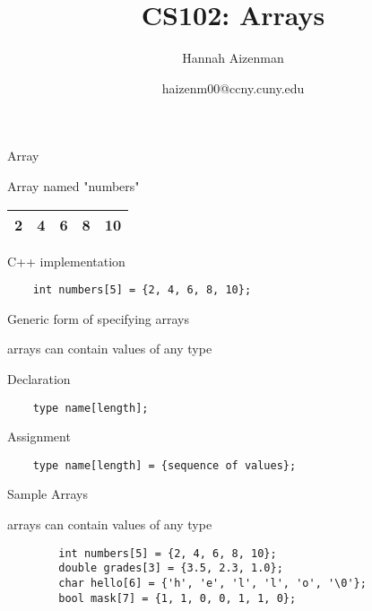 \documentclass[xcolor={dvipsnames}]{beamer}
\begin{document}
\title{ CS102: Arrays}
\author{Hannah Aizenman}
\date{haizenm00@ccny.cuny.edu}


\begin{frame}
	\titlepage
\end{frame}


\begin{frame}[fragile]{Array}
	\begin{block}{Array named "numbers"}
	\begin{table}
	\Huge
	\begin{tabular}{|c|c|c|c|c|}
	\hline
	2  & 4 & 6 & 8 & 10\\
	\hline
	\end{tabular}
	\end{table}
	\end{block}
	\pause
	\begin{block}{C++ implementation}
	\begin{verbatim}
	int numbers[5] = {2, 4, 6, 8, 10};
	\end{verbatim}
	\end{block}
\end{frame}

\begin{frame}[fragile]{Generic form of specifying arrays}
\begin{center}
	arrays can contain values of any type
\end{center}
\begin{block}{Declaration}
	\begin{verbatim}
	type name[length];
	\end{verbatim}
\end{block}
\begin{block}{Assignment}
	\begin{verbatim}
	type name[length] = {sequence of values};
	\end{verbatim}
	\end{block}
\end{frame}

\begin{frame}[fragile]{Sample Arrays}
	\begin{center}
		arrays can contain values of any type
	\end{center}
	\begin{verbatim}
		int numbers[5] = {2, 4, 6, 8, 10};
		double grades[3] = {3.5, 2.3, 1.0};
		char hello[6] = {'h', 'e', 'l', 'l', 'o', '\0'};
		bool mask[7] = {1, 1, 0, 0, 1, 1, 0};
	\end{verbatim}
\end{frame}
\end{document}
